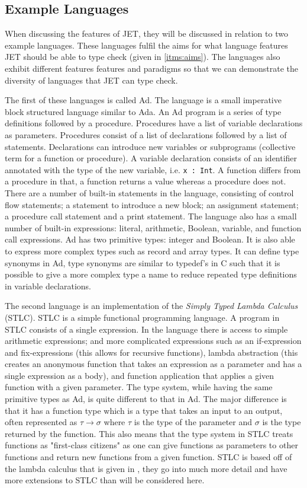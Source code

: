 \subsection{Example Languages}
\label{sec:exampleLanguages}
When discussing the features of JET, they will be discussed in relation to two example languages.
These languages fulfil the aims for what language features JET should be able to type check (given in \autoref{itms:aims}).
The languages also exhibit different features features and paradigms so that we can demonstrate the diversity of languages that JET can type check.

The first of these languages is called Ad.
The language is a small imperative block structured language similar to Ada.
An Ad program is a series of type definitions followed by a procedure.
Procedures have a list of variable declarations as parameters.
Procedures consist of a list of declarations followed by a list of statements.
Declarations can introduce new variables or subprograms (collective term for a function or procedure).
A variable declaration consists of an identifier annotated with the type of the new variable, i.e. \texttt{x : Int}.
A function differs from a procedure in that, a function returns a value whereas a procedure does not.
There are a number of built-in statements in the language, consisting of control flow statements; a statement to introduce a new block; an assignment statement; a procedure call statement and a print statement. 
The language also has a small number of built-in expressions: literal, arithmetic, Boolean, variable, and function call expressions.
Ad has two primitive types: integer and Boolean.
It is also able to express more complex types such as record and array types.
It can define type synonyms in Ad, type synonyms are similar to typedef's in C such that it is possible to give a more complex type a name to reduce repeated type definitions in variable declarations.

The second language is an implementation of the \textit{Simply Typed Lambda Calculus} (STLC).
STLC is a simple functional programming language.
A program in STLC consists of a single expression.
In the language there is access to simple arithmetic expressions; and more complicated expressions such as an if-expression and fix-expressions (this allows for recursive functions), lambda abstraction (this creates an anonymous function that takes an expression as a parameter and has a single expression as a body), and function application that applies a given function with a given parameter.
The type system, while having the same primitive types as Ad, is quite different to that in Ad.
The major difference is that it has a function type which is a type that takes an input to an output, often represented as $\tau \rightarrow \sigma$ where $\tau$ is the type of the parameter and $\sigma$ is the type returned by the function.
This also means that the type system in STLC treats functions as "first-class citizens" as one can give functions as parameters to other functions and return new functions from a given function.
STLC is based off of the lambda calculus that is given in \textcite{pierce2002types}, they go into much more detail and have more extensions to STLC than will be considered here.

